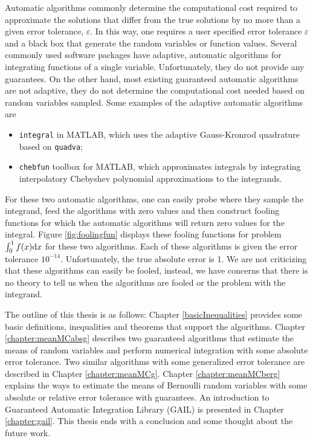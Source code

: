 \documentclass{iitthesis}
\theoremstyle{definition}
\begin{document}
Automatic algorithms commonly determine the computational cost required to approximate the solutions that differ from the true solutions by no more than a given error tolerance, $\varepsilon$. In this way, one requires a user specified error tolerance $\varepsilon$ and a black box that generate the random variables or function values. Several commonly used software packages have adaptive, automatic algorithms for integrating functions of a single variable. Unfortunately, they do not provide any guarantees. On the other hand, most existing guaranteed automatic algorithms are not adaptive, they do not determine the computational cost needed based on random variables sampled. Some examples of the adaptive automatic algorithms are
\begin{itemize}
\item {\tt integral} \cite{Shampone08} in MATLAB, which uses the adaptive Gauss-Kronrod quadrature based on {\tt quadva};
\item {\tt chebfun} toolbox \cite{Chebfun14} for MATLAB, which approximates integrals by integrating interpolatory Chebyshev polynomial approximations to the integrands.
\end{itemize}
For these two automatic algorithms, one can easily probe where they sample the integrand, feed the algorithms with zero values and then construct fooling functions for which the automatic algorithms will return zero values for the integral. Figure \ref{fig:foolingfun} displays these fooling functions for problem $\int_0^1f(x){\rm d} x$ for these two algorithms. Each of these algorithms is given the error tolerance $10^{-14}$. Unfortunately, the true absolute error is 1. We are not criticizing that these algorithms can easily be fooled, instead, we have concerns that there is no theory to tell us when the algorithms are fooled or the problem with the integrand.



The outline of this thesis is as follows: Chapter \ref{basicInequalities} provides some basic definitions, inequalities and theorems that support the algorithms. Chapter \ref{chapter:meanMCabsg} describes two guaranteed algorithms that estimate the means of random variables and perform numerical integration with some absolute error tolerance. Two similar algorithms with some generalized error tolerance are described in Chapter \ref{chapter:meanMCg}. Chapter \ref{chapter:meanMCberg} explains the ways to estimate the means of Bernoulli random variables with some absolute or relative error tolerance with guarantees. An introduction to Guaranteed Automatic Integration Library (GAIL) is presented in Chapter \ref{chapter:gail}. This thesis ends with a conclusion and some thought about the future work.
\end{document}
